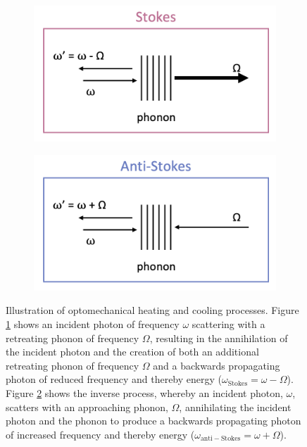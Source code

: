 \begin{figure}[t]
    \centering
    \begin{subfigure}[b]{0.49\textwidth}
        \centering
        \includegraphics[width=\textwidth]{figs/3-Cooling/StokesHeatingProcess.png}
        \caption{}
        \label{fig:Cooling:StokesHeating}
    \end{subfigure}
    \hfill
    \begin{subfigure}[b]{0.49\textwidth}
        \centering
        \includegraphics[width=\textwidth]{figs/3-Cooling/anti-StokesCoolingProcess.png}
        \caption{}
        \label{fig:Cooling:anti-StokesCooling}
    \end{subfigure}
    \caption{Illustration of optomechanical heating and cooling processes. Figure \ref{fig:Cooling:StokesHeating} shows an incident photon of frequency \(\omega\) scattering with a retreating phonon of frequency \(\Omega\), resulting in the annihilation of the incident photon and the creation of both an additional retreating phonon of frequency \(\Omega\) and a backwards propagating photon of reduced frequency and thereby energy (\(\omega_{\mathrm{Stokes}} = \omega - \Omega\)). Figure \ref{fig:Cooling:anti-StokesCooling} shows the inverse process, whereby an incident photon, \(\omega\), scatters with an approaching phonon, \(\Omega\), annihilating the incident photon and the phonon to produce a backwards propagating photon of increased frequency and thereby energy (\(\omega_{\mathrm{anti-Stokes}} = \omega + \Omega\)).}
    \label{fig:Cooling:StokesProcesses}
\end{figure}

